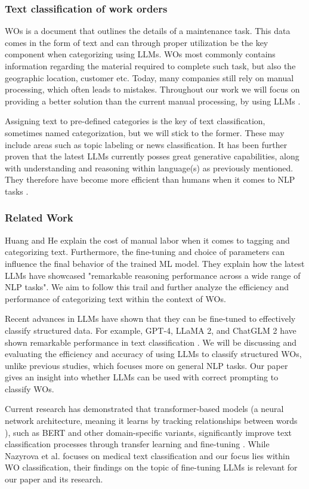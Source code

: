 \subsubsection{Text classification of work orders}

WOs is a document that outlines the details of a maintenance task.
This data comes in the form of text and can through proper utilization be the key component when categorizing using LLMs.
WOs most commonly contains information regarding the material required to complete such task,
but also the geographic location, customer etc.
Today, many companies still rely on manual processing, which often leads to mistakes.
Throughout our work we will focus on providing a better solution than the current manual processing,
by using LLMs \cite{ibm2023} \cite{li2024}.

Assigning text to pre-defined categories is the key of text classification,
sometimes named categorization, but we will stick to the former.
These may include areas such as topic labeling or news classification.
It has been further proven that the latest LLMs currently posses great generative capabilities,
along with understanding and reasoning within language(s) as previously mentioned.
They therefore have become more efficient than humans when it comes to NLP tasks \cite{zhang2024}.

\subsubsection{Related Work}

Huang and He \cite{huang2024} explain the cost of manual labor when it comes to tagging and categorizing text.
Furthermore, the fine-tuning and choice of parameters can influence the final behavior of the trained ML model.
They explain how the latest LLMs have showcased "remarkable reasoning performance across a wide range of
NLP tasks".
We aim to follow this trail and further analyze the efficiency and performance of categorizing text within the
context of WOs.

\bigskip
Recent advances in LLMs have shown that they can be fine-tuned to effectively classify structured data.
For example, GPT-4, LLaMA 2, and ChatGLM 2 have shown remarkable performance in text classification \cite{zhang2024}.
We will be discussing and evaluating the efficiency and accuracy of using LLMs
to classify structured WOs, unlike previous studies, which focuses more on general NLP tasks.
Our paper gives an insight into whether LLMs can be used with correct prompting to classify WOs.

\bigskip
Current research has demonstrated that transformer-based models
(a neural network architecture, meaning it learns by tracking relationships between words \cite{merritt2022}),
such as BERT and other domain-specific variants, significantly improve text classification processes through
transfer learning and fine-tuning \cite{nazyrova2024}.
While Nazyrova et al. focuses on medical text classification and our focus lies within WO classification,
their findings on the topic of fine-tuning LLMs is relevant for our paper and its research.
